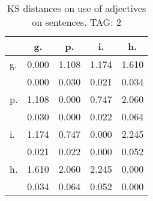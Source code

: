 \begin{table}[h!]
\begin{center}
\begin{tabular}{| l | c | c | c | c |}\hline
 & g. & p. & i. & h. \\\hline
g. & 0.000  & 1.108  & 1.174  & 1.610 \\\hline
 & 0.000  & 0.030  & 0.021  & 0.034 \\\hline
p. & 1.108  & 0.000  & 0.747  & 2.060 \\\hline
 & 0.030  & 0.000  & 0.022  & 0.064 \\\hline
i. & 1.174  & 0.747  & 0.000  & 2.245 \\\hline
 & 0.021  & 0.022  & 0.000  & 0.052 \\\hline
h. & 1.610  & 2.060  & 2.245  & 0.000 \\\hline
 & 0.034  & 0.064  & 0.052  & 0.000 \\\hline
\end{tabular}
\caption{KS distances on use of adjectives on sentences. TAG: 2}
\end{center}
\end{table}
